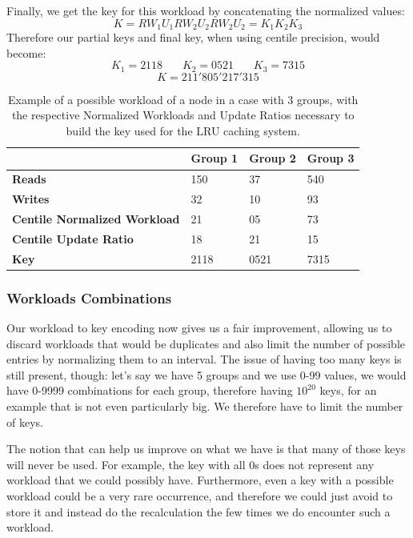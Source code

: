 Finally, we get the key for this workload by concatenating the normalized values:
$$ K = RW_1 U_1 RW_2 U_2 RW_2 U_2 = K_1 K_2 K_3 $$
Therefore our partial keys and final key, when using centile precision, would become:
$$ K_1 = 2118\ \ \ \ \ \ \ \ K_2 = 0521\ \ \ \ \ \ \ \ K_3 =7315 $$
$$ K = 211'805'217'315 $$

\begin{table}[!htb]
  \centering
  \begin{tabular}{l l l l}
    \hline
    & \textbf{Group 1} & \textbf{Group 2} & \textbf{Group 3} \\
    \hline
    \textbf{Reads} & 150 & 37 & 540 \\
    \textbf{Writes} & 32 & 10 & 93 \\
    \hline
    \textbf{Centile Normalized Workload} & 21 & 05 & 73 \\
    \textbf{Centile Update Ratio} & 18 & 21 & 15 \\
    \textbf{Key} & 2118 & 0521 & 7315 \\
  \end{tabular}
  \caption{Example of a possible workload of a node in a case with 3 groups, with the respective Normalized Workloads and Update Ratios necessary to build the key used for the LRU caching system.}\label{tab:lru-workload-example}
\end{table}


\subsubsection{Workloads Combinations}\label{sec:Workloads-combinations}
Our workload to key encoding now gives us a fair improvement, allowing us to discard workloads that would be duplicates and also limit the number of possible entries by normalizing them to an interval. The issue of having too many keys is still present, though: let's say we have 5 groups and we use 0-99 values, we would have 0-9999 combinations for each group, therefore having $10^{20}$ keys, for an example that is not even particularly big. We therefore have to limit the number of keys. 

The notion that can help us improve on what we have is that many of those keys will never be used. For example, the key with all 0s does not represent any workload that we could possibly have. Furthermore, even a key with a possible workload could be a very rare occurrence, and therefore we could just avoid to store it and instead do the recalculation the few times we do encounter such a workload. 


